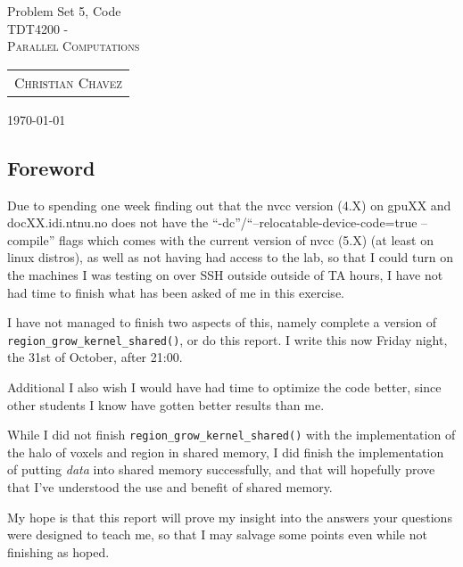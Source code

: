 \documentclass[fontsize=11pt, paper=a4, titlepage]{article}
\begin{document}
\begin{center}

{\huge Problem Set 5, Code}\\[0.5cm]

\textsc{\LARGE TDT4200 -}\\[0.5cm]
\textsc{\large Parallel Computations}\\[1.0cm]

\begin{table}[h]
    \centering
    \begin{tabular}{c}
        \textsc{Christian Chavez}
    \end{tabular}
\end{table}

\end{center}
\vfill
\hfill \large{\today}
\clearpage

\subsection*{Foreword}
Due to spending one week finding out that the nvcc version (4.X) on gpuXX and
docXX.idi.ntnu.no does not have the ``-dc''/``--relocatable-device-code=true
--compile'' flags which comes with the current version of nvcc (5.X) (at least
on linux distros), as well as not having had access to the lab, so that I could
turn on the machines I was testing on over SSH outside outside of TA hours, I
have not had time to finish what has been asked of me in this exercise.

I have not managed to finish two aspects of this, namely complete a version of
\verb#region_grow_kernel_shared()#, or do this report. I write this now Friday
night, the 31st of October, after 21:00.

Additional I also wish I would have had time to optimize the code better, since
other students I know have gotten better results than me.

While I did not finish \verb#region_grow_kernel_shared()# with the
implementation of the halo of voxels and region in shared memory, I did finish
the implementation of putting \textit{data} into shared memory successfully, and
that will hopefully prove that I've understood the use and benefit of shared
memory.

My hope is that this report will prove my insight into the answers your
questions were designed to teach me, so that I may salvage some points even
while not finishing as hoped.
\end{document}
